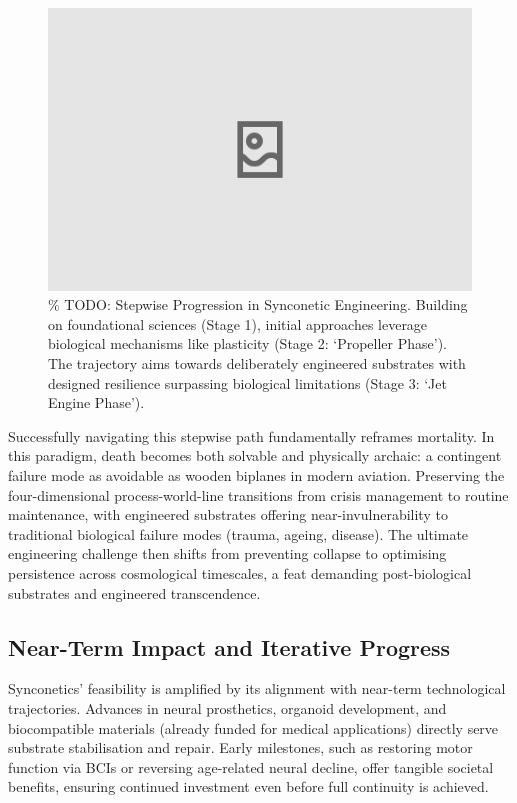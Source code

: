\documentclass[10pt]{article}
\begin{document}
\begin{sloppypar}
  \begin{figure}[ht!]
    \centering
    \includegraphics[width=\textwidth]{figures/engineering-progression.png}
    \caption{\% TODO: Stepwise Progression in Synconetic Engineering. Building on foundational sciences (Stage 1), initial approaches leverage biological mechanisms like plasticity (Stage 2: ‘Propeller Phase’). The trajectory aims towards deliberately engineered substrates with designed resilience surpassing biological limitations (Stage 3: ‘Jet Engine Phase’).}
    \label{fig:engineering-progression}
  \end{figure}

  Successfully navigating this stepwise path fundamentally reframes mortality. In this paradigm, death becomes both solvable and physically archaic: a contingent failure mode as avoidable as wooden biplanes in modern aviation. Preserving the four-dimensional process-world-line transitions from crisis management to routine maintenance, with engineered substrates offering near-invulnerability to traditional biological failure modes (trauma, ageing, disease). The ultimate engineering challenge then shifts from preventing collapse to optimising persistence across cosmological timescales, a feat demanding post-biological substrates and engineered transcendence.

  \subsection{Near-Term Impact and Iterative Progress}
  \label{sec:near-term-impact}

  Synconetics’ feasibility is amplified by its alignment with near-term technological trajectories. Advances in neural prosthetics, organoid development, and biocompatible materials (already funded for medical applications) directly serve substrate stabilisation and repair. Early milestones, such as restoring motor function via BCIs or reversing age-related neural decline, offer tangible societal benefits, ensuring continued investment even before full continuity is achieved.


\end{sloppypar}
\end{document}
